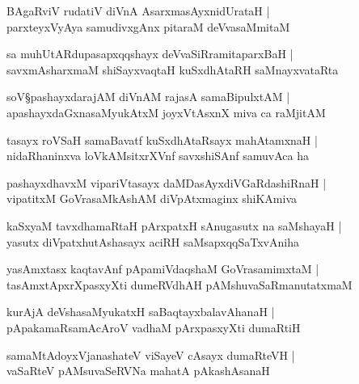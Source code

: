 \begin{shloka}
BAgaRviV rudatiV diVnA AsarxmasAyxnidUrataH |\\
parxteyxVyAya samudivxgAnx pitaraM deVvasaMmitaM 
\end{shloka}

\begin{shloka}
sa muhUtARdupasapxqqshayx deVvaSiRramitaparxBaH |\\
savxmAsharxmaM shiSayxvaqtaH kuSxdhAtaRH saMnayxvataRta
\end{shloka}

\begin{shloka}
soV\S pashayxdarajAM diVnAM rajasA samaBipulxtAM |\\
apashayxdaGxnasaMyukAtxM joyxVtAsxnX miva ca raMjitAM
\end{shloka}

\begin{shloka}
tasayx roVSaH samaBavatf kuSxdhAtaRsayx mahAtamxnaH |\\
nidaRhaninxva loVkAMsitxrXVnf savxshiSAnf samuvAca ha 
\end{shloka}

\begin{shloka}
pashayxdhavxM vipariVtasayx daMDasAyxdiVGaRdashiRnaH |\\
vipatitxM GoVrasaMkAshAM diVpAtxmaginx shiKAmiva
\end{shloka}

\begin{shloka}
kaSxyaM tavxdhamaRtaH pArxpatxH sAnugasutx na saMshayaH |\\
yasutx diVpatxhutAshasayx aciRH saMsapxqqSaTxvAniha 
\end{shloka}

\begin{shloka}
yasAmxtasx kaqtavAnf pApamiVdaqshaM GoVrasamimxtaM |\\
tasAmxtApxrXpasxyXti dumeRVdhAH pAMshuvaSaRmanutatxmaM 
\end{shloka}

\begin{shloka}
kurAjA deVshasaMyukatxH saBaqtayxbalavAhanaH |\\
pApakamaRsamAcAroV vadhaM pArxpasxyXti dumaRtiH 
\end{shloka}

\begin{shloka}
samaMtAdoyxVjanashateV viSayeV cAsayx dumaRteVH |\\
vaSaRteV pAMsuvaSeRVNa mahatA pAkashAsanaH 
\end{shloka}

